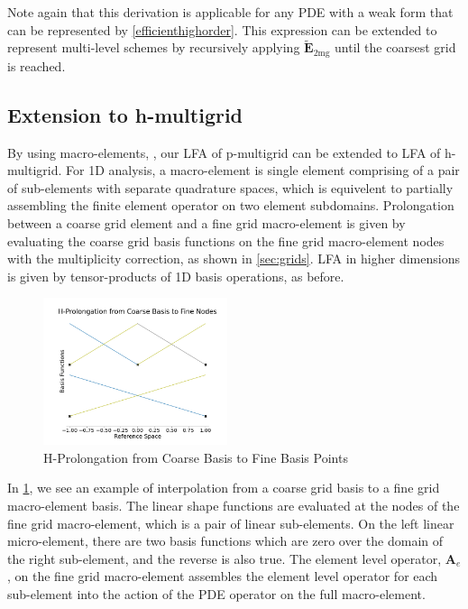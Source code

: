 \documentclass[review]{siamart190516}
\begin{document}
Note again that this derivation is applicable for any PDE with a weak form that can be represented by \cref{efficienthighorder}.
This expression can be extended to represent multi-level schemes by recursively applying $\tilde{\mathbf{E}}_{\text{2mg}}$ until the coarsest grid is reached.

\subsection{Extension to h-multigrid}\label{sec:previouswork}

By using macro-elements, \cite{kumar2019local} \cite{brown2019local}, our LFA of p-multigrid can be extended to LFA of h-multigrid.
For 1D analysis, a macro-element is single element comprising of a pair of sub-elements with separate quadrature spaces, which is equivelent to partially assembling the finite element operator on two element subdomains.
Prolongation between a coarse grid element and a fine grid macro-element is given by evaluating the coarse grid basis functions on the fine grid macro-element nodes with the multiplicity correction, as shown in \cref{sec:grids}.
LFA in higher dimensions is given by tensor-products of 1D basis operations, as before.

\begin{figure}[!ht]
  \centering
  \includegraphics[width=0.48\textwidth]{img/hProlongation}
  \caption{H-Prolongation from Coarse Basis to Fine Basis Points}
  \label{fig:h_prolongation}
\end{figure}

In \cref{fig:h_prolongation}, we see an example of interpolation from a coarse grid basis to a fine grid macro-element basis.
The linear shape functions are evaluated at the nodes of the fine grid macro-element, which is a pair of linear sub-elements.
On the left linear micro-element, there are two basis functions which are zero over the domain of the right sub-element, and the reverse is also true.
The element level operator, $\mathbf{A}_e$, on the fine grid macro-element assembles the element level operator for each sub-element into the action of the PDE operator on the full macro-element.
\end{document}
